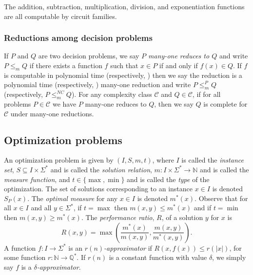 \documentclass[]{article}
\newcommand{\mornt}{\leq_m}
\newcommand{\mor}{\mornt^P}
\newcommand{\mornc}{\mornt^{NC}}
\begin{document}
\begin{lemma}
  The addition, subtraction, multiplication, division, and exponentiation functions are all computable by \NC{} circuit families.
\end{lemma}

\subsubsection{Reductions among decision problems}

If $P$ and $Q$ are two decision problems, we say \emph{$P$ many-one reduces to $Q$} and write $P \mornt Q$ if there exists a function $f$ such that $x \in P$ if and only if $f(x) \in Q$.
If $f$ is computable in polynomial time (respectively, \NC) then we say the reduction is a polynomial time (respectively, \NC) many-one reduction and write $P \mor Q$ (respectively, $P \mornc Q$).
For any complexity class $\mathcal{C}$ and $Q \in \mathcal{C}$, if for all problems $P \in \mathcal{C}$ we have $P$ many-one reduces to $Q$, then we say $Q$ is complete for $\mathcal{C}$ under many-one reductions.

\subsection{Optimization problems}

An optimization problem is given by $(I, S, m, t)$, where $I$ is called the \emph{instance set}, $S \subseteq I \times \Sigma^*$ and is called the \emph{solution relation}, $m \colon I \times \Sigma^* \to \mathbb{N}$ and is called the \emph{measure function}, and $t\in\{\max, \min\}$ and is called the \emph{type} of the optimization.
The set of solutions corresponding to an instance $x \in I$ is denoted $S_P(x)$.
The \emph{optimal measure} for any $x \in I$ is denoted $m^*(x)$.
Observe that for all $x \in I$ and all $y \in \Sigma^*$, if $t = \max$ then $m(x, y) \leq m^*(x)$ and if $t = \min$ then $m(x, y) \geq m^*(x)$.
The \emph{performance ratio}, $R$, of a solution $y$ for $x$ is
\begin{displaymath}
  R(x, y) = \max{\left(\frac{m^*(x)}{m(x, y)}, \frac{m(x, y)}{m^*(x, y)}\right)}.
\end{displaymath}
A function $f \colon I \to \Sigma^*$ is an \emph{$r(n)$-approximator} if $R(x, f(x)) \leq r(|x|)$, for some function $r \colon \mathbb{N} \to \mathbb{Q}^*$.
If $r(n)$ is a constant function with value $\delta$, we simply say $f$ is a \emph{$\delta$-approximator}.
\end{document}
